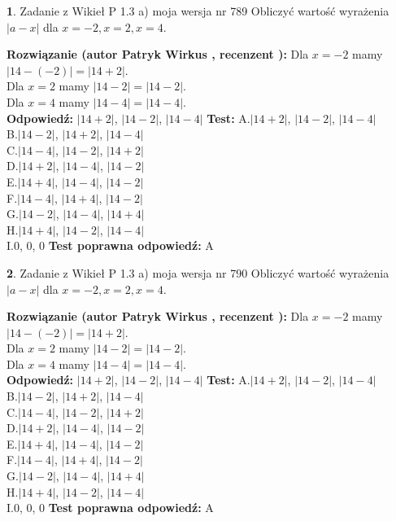 \documentclass[12pt, a4paper]{article}
\theoremstyle{definition} %
\newtheorem{zad}{}
\newcommand{\zadStart}[1]{\begin{zad}#1\newline}
\newcommand{\zadStop}{\end{zad}}
\newcommand{\rozwStart}[2]{\noindent \textbf{Rozwiązanie (autor #1 , recenzent #2): }\newline}
\newcommand{\rozwStop}{\newline}
\newcommand{\odpStart}{\noindent \textbf{Odpowiedź:}\newline}
\newcommand{\odpStop}{\newline}
\newcommand{\testStart}{\noindent \textbf{Test:}\newline}
\newcommand{\testStop}{\newline}
\newcommand{\kluczStart}{\noindent \textbf{Test poprawna odpowiedź:}\newline}
\newcommand{\kluczStop}{\newline}
\begin{document}
\zadStart{Zadanie z Wikieł P 1.3 a) moja wersja nr 789}
Obliczyć wartość wyrażenia $|a - x|$ dla $x=-2,x=2,x=4$.
\zadStop
\rozwStart{Patryk Wirkus}{}
Dla $x = -2$ mamy $|14 - (-2)| = |14 + 2|$.\\
Dla $x = 2$ mamy $|14 - 2| = |14 - 2|$.\\
Dla $x = 4$ mamy $|14 - 4| = |14 - 4|$.\\
\rozwStop
\odpStart
$|14 + 2|$, $|14 - 2|$, $|14 - 4|$
\odpStop
\testStart
A.$|14 + 2|$, $|14 - 2|$, $|14 - 4|$\\
B.$|14 - 2|$, $|14 + 2|$, $|14 - 4|$\\
C.$|14 - 4|$, $|14 - 2|$, $|14 + 2|$\\
D.$|14 + 2|$, $|14 - 4|$, $|14 - 2|$\\
E.$|14 + 4|$, $|14 - 4|$, $|14 - 2|$\\
F.$|14 - 4|$, $|14 + 4|$, $|14 - 2|$\\
G.$|14 - 2|$, $|14 - 4|$, $|14 + 4|$\\
H.$|14 + 4|$, $|14 - 2|$, $|14 - 4|$\\
I.$0$, $0$, $0$
\testStop
\kluczStart
A
\kluczStop



\zadStart{Zadanie z Wikieł P 1.3 a) moja wersja nr 790}
Obliczyć wartość wyrażenia $|a - x|$ dla $x=-2,x=2,x=4$.
\zadStop
\rozwStart{Patryk Wirkus}{}
Dla $x = -2$ mamy $|14 - (-2)| = |14 + 2|$.\\
Dla $x = 2$ mamy $|14 - 2| = |14 - 2|$.\\
Dla $x = 4$ mamy $|14 - 4| = |14 - 4|$.\\
\rozwStop
\odpStart
$|14 + 2|$, $|14 - 2|$, $|14 - 4|$
\odpStop
\testStart
A.$|14 + 2|$, $|14 - 2|$, $|14 - 4|$\\
B.$|14 - 2|$, $|14 + 2|$, $|14 - 4|$\\
C.$|14 - 4|$, $|14 - 2|$, $|14 + 2|$\\
D.$|14 + 2|$, $|14 - 4|$, $|14 - 2|$\\
E.$|14 + 4|$, $|14 - 4|$, $|14 - 2|$\\
F.$|14 - 4|$, $|14 + 4|$, $|14 - 2|$\\
G.$|14 - 2|$, $|14 - 4|$, $|14 + 4|$\\
H.$|14 + 4|$, $|14 - 2|$, $|14 - 4|$\\
I.$0$, $0$, $0$
\testStop
\kluczStart
A
\kluczStop
\end{document}
